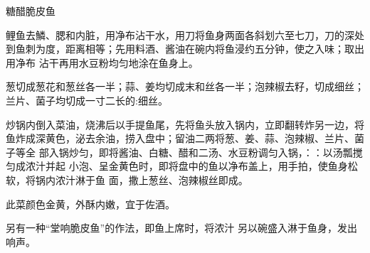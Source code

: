 \begin{recipe}{糖醋脆皮鱼}

\ingredients


\preparation

\step 鲤鱼去鱗、腮和内脏，用净布沾干水，用刀将鱼身两面各斜划六至七刀，刀的深处
到鱼刺为度，距离相等；先用料酒、酱油在碗内将鱼浸约五分钟，使之入味；取出用净布
沾干再用水豆粉均匀地涂在鱼身上。

\step 葱切成葱花和葱丝各一半；蒜、姜均切成末和丝各一半；泡辣椒去籽，切成细丝；
兰片、菌子均切成一寸二长的:细丝。

\step 炒锅内倒入菜油，烧沸后以手提鱼尾，先将鱼头放入锅内，立即翻转炸另一边，将
鱼炸成深黄色，泌去余油，捞入盘中；留油二两将葱、姜、蒜、泡辣椒、兰片、菌子等全
部入锅炒匀，即将酱油、白糖、醋和二汤、水豆粉调匀入锅，：：以汤瓢搅匀成浓汁并起
小泡、呈金黄色时，即将盘中的鱼以净布盖上，用手拍，使鱼身松软，将锅内浓汁淋于鱼
面，撒上葱丝、泡辣椒丝即成。

\features

此菜颜色金黄，外酥内嫩，宜于佐酒。

另有一种“堂响脆皮鱼”的作法，即鱼上席时，将浓汁 另以碗盛入淋于鱼身，发出响声。

\end{recipe}

